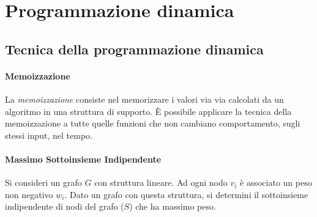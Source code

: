\documentclass[11pt]{book}
\begin{document}
\chapter{Programmazione dinamica}
\section{Tecnica della programmazione dinamica}
\subsubsection{Memoizzazione}
La \textit{memoizzazione} consiste nel memorizzare i valori via via calcolati da un algoritmo in una struttura di supporto.
È possibile applicare la tecnica della memoizzazione a tutte quelle funzioni che non cambiano comportamento, sugli stessi 
input, nel tempo.
\subsubsection{Massimo Sottoinsieme Indipendente}
Si consideri un grafo $G$ con struttura lineare. Ad ogni nodo $v_i$ è associato un peso non negativo $w_i$. 
Dato un grafo con questa struttura, si determini il sottoinsieme indipendente di nodi del grafo ($S$) che ha massimo peso. 
\end{document}
